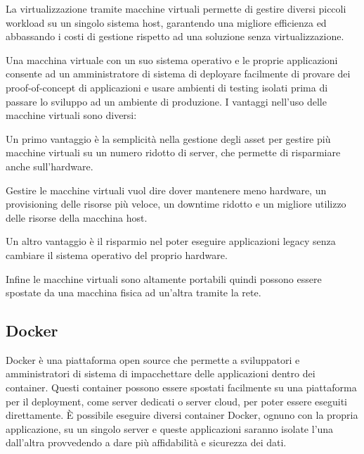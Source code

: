 \documentclass[12pt,a4paper]{article}
\begin{document}
La virtualizzazione tramite macchine virtuali permette di gestire diversi piccoli workload su un singolo sistema host, garantendo una migliore efficienza ed abbassando i costi di gestione rispetto ad una soluzione senza virtualizzazione.

Una macchina virtuale con un suo sistema operativo e le proprie applicazioni consente ad un amministratore di sistema di deployare facilmente di provare dei proof-of-concept di applicazioni e usare ambienti di testing isolati prima di passare lo sviluppo ad un ambiente di produzione.
\newpage
I vantaggi nell'uso delle macchine virtuali sono diversi:

Un primo vantaggio è la semplicità nella gestione degli asset per gestire più macchine virtuali su un numero ridotto di server, che permette di risparmiare anche sull'hardware.

Gestire le macchine virtuali vuol dire dover mantenere meno hardware, un provisioning delle risorse più veloce, un downtime ridotto e un migliore utilizzo delle risorse della macchina host.

Un altro vantaggio è il risparmio nel poter eseguire applicazioni legacy senza cambiare il sistema operativo del proprio hardware. 

Infine le macchine virtuali sono altamente portabili quindi possono essere spostate da una macchina fisica ad un'altra tramite la rete.\cite{oracle_docker}

\subsection{Docker}
Docker è una piattaforma open source che permette a sviluppatori e amministratori di sistema di impacchettare delle applicazioni dentro dei container. Questi container possono essere spostati facilmente su una piattaforma per il deployment, come server dedicati o server cloud, per poter essere eseguiti direttamente. È possibile eseguire diversi container Docker, ognuno con la propria applicazione, su un singolo server e queste applicazioni saranno isolate l'una dall'altra provvedendo a dare più affidabilità e sicurezza dei dati.\cite{oracle_docker}
\end{document}
